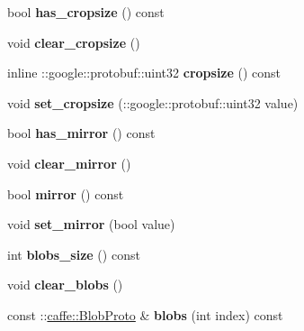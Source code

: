\begin{DoxyCompactItemize}
bool {\bfseries has\+\_\+cropsize} () const
\item 
\mbox{\label{classcaffe_1_1_v0_layer_parameter_a814e516895e642ab6703d499d7e0cad5}} 
void {\bfseries clear\+\_\+cropsize} ()
\item 
\mbox{\label{classcaffe_1_1_v0_layer_parameter_a4122bcb5105c914aa3f1d586c50a2e33}} 
inline \+::google\+::protobuf\+::uint32 {\bfseries cropsize} () const
\item 
\mbox{\label{classcaffe_1_1_v0_layer_parameter_a003b864ffe6b3b7c4405ce5bb0e69e3d}} 
void {\bfseries set\+\_\+cropsize} (\+::google\+::protobuf\+::uint32 value)
\item 
\mbox{\label{classcaffe_1_1_v0_layer_parameter_ade9cad482b5b7166c9828e61371bbb21}} 
bool {\bfseries has\+\_\+mirror} () const
\item 
\mbox{\label{classcaffe_1_1_v0_layer_parameter_ae58bf4b31c408c0d73a5866c147a8938}} 
void {\bfseries clear\+\_\+mirror} ()
\item 
\mbox{\label{classcaffe_1_1_v0_layer_parameter_a135400c7e3fd11b271d2c86b4325d38e}} 
bool {\bfseries mirror} () const
\item 
\mbox{\label{classcaffe_1_1_v0_layer_parameter_aa9dc1dbb4b9eb2662fbaa4b011b0351d}} 
void {\bfseries set\+\_\+mirror} (bool value)
\item 
\mbox{\label{classcaffe_1_1_v0_layer_parameter_a174df2f8c1116094725583215dc115c2}} 
int {\bfseries blobs\+\_\+size} () const
\item 
\mbox{\label{classcaffe_1_1_v0_layer_parameter_a74c4a179ff0f35ec0552ad771e37e594}} 
void {\bfseries clear\+\_\+blobs} ()
\item 
\mbox{\label{classcaffe_1_1_v0_layer_parameter_aeeec3e72160ee10de4c1bbd77144c9b3}} 
const \+::\mbox{\hyperlink{classcaffe_1_1_blob_proto}{caffe\+::\+Blob\+Proto}} \& {\bfseries blobs} (int index) const

\end{DoxyCompactItemize}

